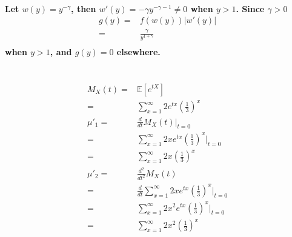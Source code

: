 \documentclass{article}
\begin{document}
            \paragraph{
                Let $w(y)=y^{-\gamma}$, then $w'(y)=-\gamma y^{-\gamma-1}\neq 0$ when $y>1$. Since $\gamma>0$
                \begin{equation*}
                    \begin{split}
                        g(y)=&f(w(y))|w'(y)|\\
                            =&\frac{\gamma}{y^{1+\gamma}}\\
                    \end{split}
                \end{equation*}
                when $y>1$, and $g(y)=0$ elsewhere.
            }
    \section{}
        \paragraph{
            \begin{equation*}
                \begin{split}
                    M_X(t)=&\mathbb{E}[e^{tX}]\\
                        =&\sum_{x=1}^\infty 2e^{tx}(\frac{1}{3})^x\\
                    \mu'_1=&\frac{d}{dt}M_X(t)|_{t=0}\\
                        =&\sum_{x=1}^\infty 2xe^{tx}(\frac{1}{3})^x|_{t=0}\\
                        =&\sum_{x=1}^\infty 2x(\frac{1}{3})^x\\
                    \mu'_2=&\frac{d^2}{dt^2}M_X(t)\\
                        =&\frac{d}{dt}\sum_{x=1}^\infty 2xe^{tx}(\frac{1}{3})^x|_{t=0}\\
                        =&\sum_{x=1}^\infty 2x^2e^{tx}(\frac{1}{3})^x|_{t=0}\\
                        =&\sum_{x=1}^\infty 2x^2(\frac{1}{3})^x\\
                \end{split}
            \end{equation*}
        }
    
    \section{}
\end{document}
